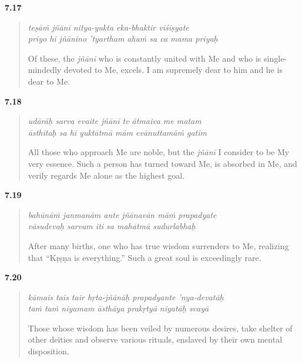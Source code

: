 \par\noindent\textbf{7.17}\par
\begin{verse}
\textit{teṣāṁ jñānī nitya-yukta eka-bhaktir viśiṣyate} \\
\textit{priyo hi jñānino ’tyartham ahaṁ sa ca mama priyaḥ}

\noindent Of these, the \textit{jñānī} who is constantly united with Me and who is single-mindedly devoted to Me, excels. I am supremely dear to him and he is dear to Me.
\end{verse}
\par



\par\noindent\textbf{7.18}\par
\begin{verse}
\textit{udārāḥ sarva evaite jñānī tv ātmaiva me matam} \\
\textit{āsthitaḥ sa hi yuktātmā mām evānuttamāṁ gatim}

\noindent All those who approach Me are noble, but the \textit{jñānī} I consider to be My very essence. Such a person has turned toward Me, is absorbed in Me, and verily regards Me alone as the highest goal.
\end{verse}
\par



\par\noindent\textbf{7.19}\par
\begin{verse}
\textit{bahūnāṁ janmanām ante jñānavān māṁ prapadyate} \\
\textit{vāsudevaḥ sarvam iti sa mahātmā sudurlabhaḥ}

\noindent After many births, one who has true wisdom surrenders to Me, realizing that \enquote{Kṛṣṇa is everything.} Such a great soul is exceedingly rare.
\end{verse}
\par



\par\noindent\textbf{7.20}\par
\begin{verse}
\textit{kāmais tais tair hṛta-jñānāḥ prapadyante ’nya-devatāḥ} \\
\textit{taṁ taṁ niyamam āsthāya prakṛtyā niyatāḥ svayā}

\noindent Those whose wisdom has been veiled by numerous desires, take shelter of other deities and observe various rituals, enslaved by their own mental disposition.
\end{verse}
\par



